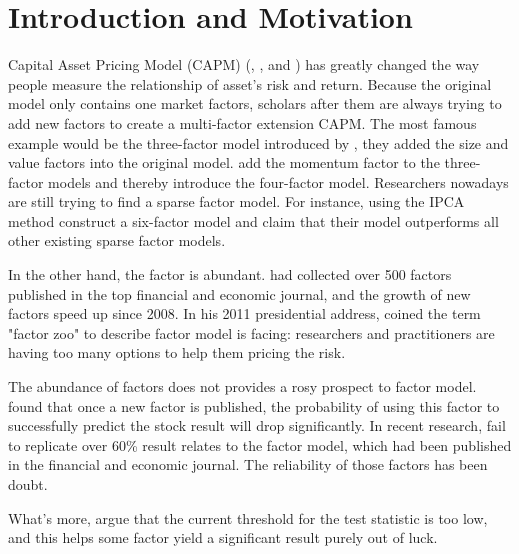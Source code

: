 \documentclass[12pt]{article}
\begin{document}

\newpage	
\tableofcontents
\newpage
	\section{Introduction and Motivation}
Capital Asset Pricing Model (CAPM) (, , and )  has greatly changed the way people measure the relationship of asset's risk and return.
Because the original model only contains one market factors, scholars after them are always trying to add new factors to create a multi-factor extension CAPM.
The most famous example would be the three-factor model  introduced by , they added the size and value factors into the original model.
 add the momentum factor to the three-factor models and thereby introduce the four-factor model. 
Researchers nowadays are  still trying to find a sparse factor model. 
For instance,  using the IPCA method construct a six-factor model and claim that their model outperforms all other existing sparse factor models.  

In the other hand, the factor is abundant. 
 had collected over 500 factors published in the top financial and economic journal,  and the growth of new factors speed up since 2008. 
In his 2011 presidential address, \citeauthor{Cochrane2011} coined the term "factor zoo" to describe factor model is facing: researchers and practitioners are having too many options to help them pricing the risk.

The abundance of factors does not provides a rosy prospect to factor model.
 found that once a new factor is published, the probability of using this factor to successfully predict the stock result will drop significantly.
In recent research,  fail to replicate over 60\% result relates to the factor model, which had been published in the financial and economic journal. 
The reliability of those factors has been doubt. 

What's more,  argue that the current threshold for the test statistic is too low, and this helps some factor yield a significant result purely out of luck. 
\end{document}
